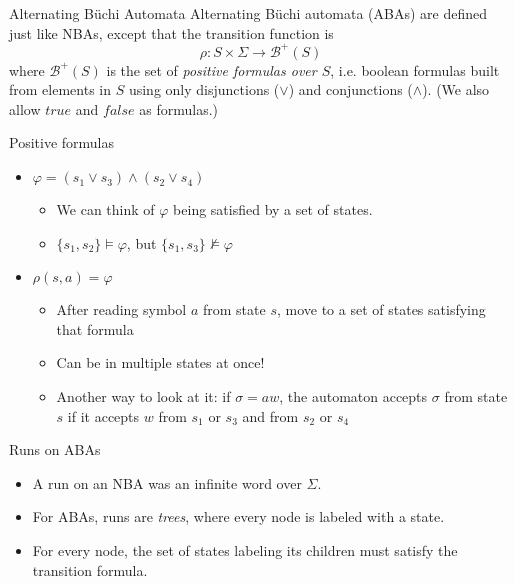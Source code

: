 \documentclass{beamer}
\begin{document}
\begin{frame}{Alternating B\"{u}chi Automata}
Alternating B\"{u}chi automata (ABAs) are defined just like NBAs, except 
that the transition function is
$$ \rho: S \times \Sigma \rightarrow \mathcal{B}^+(S)$$
where $\mathcal{B}^+(S)$ is the set of \emph{positive formulas over $S$}, i.e. boolean formulas built from
elements in $S$ using only disjunctions ($\vee$) and conjunctions ($\wedge$). (We also allow $true$ and $false$
as formulas.)
\end{frame}

\begin{frame}{Positive formulas}
\begin{itemize}
\item $\varphi = (s_1 \vee s_3) \wedge (s_2 \vee s_4) $
    \begin{itemize}
    \item We can think of $\varphi$ being satisfied by a set of states. \\
    \item $\{s_1, s_2\} \models \varphi$, but $\{s_1, s_3\} \not \models \varphi$
    \end{itemize}
\pause
\item $\rho(s, a) = \varphi$
    \begin{itemize}
    \item After reading symbol $a$ from state $s$, move to a set of states
    satisfying that formula
    \item Can be in multiple states at once!
    \item Another way to look at it: if $\sigma = aw$, the automaton accepts
    $\sigma$ from state $s$ if it accepts $w$ from $s_1$ or $s_3$ and from
    $s_2$ or $s_4$
    \end{itemize}
\end{itemize}
\end{frame}

\begin{frame}{Runs on ABAs}
\begin{itemize}
\item A run on an NBA was an infinite word over $\Sigma$.
\item For ABAs, runs are \emph{trees}, where every node is labeled with a state.
\item For every node, the set of states labeling its children must satisfy the transition formula.
\end{itemize}
\end{frame}
\end{document}
